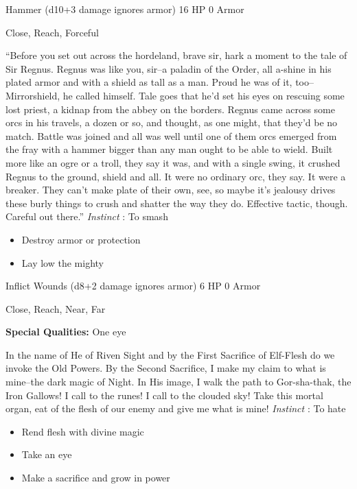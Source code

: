 

 Hammer (d10+3 damage ignores armor) 16 HP 0 Armor


 Close, Reach, Forceful


 ``Before you set out across the hordeland, brave sir, hark a moment to the tale of Sir Regnus. Regnus was like you, sir--a paladin of the Order, all a-shine in his plated armor and with a shield as tall as a man. Proud he was of it, too--Mirrorshield, he called himself. Tale goes that he'd set his eyes on rescuing some lost priest, a kidnap from the abbey on the borders. Regnus came across some orcs in his travels, a dozen or so, and thought, as one might, that they'd be no match. Battle was joined and all was well until one of them orcs emerged from the fray with a hammer bigger than any man ought to be able to wield. Built more like an ogre or a troll, they say it was, and with a single swing, it crushed Regnus to the ground, shield and all. It were no ordinary orc, they say. It were a breaker. They can't make plate of their own, see, so maybe it's jealousy drives these burly things to crush and shatter the way they do. Effective tactic, though. Careful out there.'' \emph{Instinct}
: To smash
\begin{itemize}
\item Destroy armor or protection
\item Lay low the mighty

\end{itemize}




 Inflict Wounds (d8+2 damage ignores armor) 6 HP 0 Armor


 Close, Reach, Near, Far


 \textbf{Special Qualities:}
 One eye


 In the name of He of Riven Sight and by the First Sacrifice of Elf-Flesh do we invoke the Old Powers. By the Second Sacrifice, I make my claim to what is mine--the dark magic of Night. In His image, I walk the path to Gor-sha-thak, the Iron Gallows! I call to the runes! I call to the clouded sky! Take this mortal organ, eat of the flesh of our enemy and give me what is mine! \emph{Instinct}
: To hate
\begin{itemize}
\item Rend flesh with divine magic
\item Take an eye
\item Make a sacrifice and grow in power

\end{itemize}


